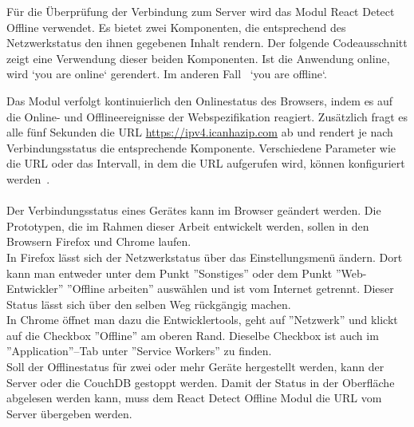 Für die Überprüfung der Verbindung zum Server wird das Modul React Detect Offline verwendet.
Es bietet zwei Komponenten, die entsprechend des Netzwerkstatus den ihnen gegebenen Inhalt rendern.
Der folgende Codeausschnitt zeigt eine Verwendung dieser beiden Komponenten. Ist die Anwendung online, wird `you are online` gerendert. Im anderen Fall ~`you are offline`.
%
\begin{center}

\end{center}
%
Das Modul verfolgt kontinuierlich den Onlinestatus des Browsers, indem es auf die Online- und Offlineereignisse der Webspezifikation reagiert. Zusätzlich fragt es alle fünf Sekunden die URL \url{https://ipv4.icanhazip.com} ab und rendert je nach Verbindungsstatus die entsprechende Komponente.
Verschiedene Parameter wie die URL oder das Intervall, in dem die URL aufgerufen wird, können konfiguriert werden~\cite{react-detect}. \\\\
%
Der Verbindungsstatus eines Gerätes kann im Browser geändert werden.
Die Prototypen, die im Rahmen dieser Arbeit entwickelt werden, sollen in den Browsern Firefox und Chrome laufen.\\
In Firefox lässt sich der Netzwerkstatus über das Einstellungsmenü ändern. Dort kann man entweder unter dem Punkt ''Sonstiges'' oder dem Punkt ''Web-Entwickler'' ''Offline arbeiten'' auswählen und ist vom Internet getrennt. Dieser Status lässt sich über den selben Weg rückgängig machen.\\
In Chrome öffnet man dazu die Entwicklertools, geht auf ''Netzwerk'' und klickt auf die Checkbox ''Offline'' am oberen Rand. Dieselbe Checkbox ist auch im ''Application''--Tab unter ''Service Workers'' zu finden.\\
Soll der Offlinestatus für zwei oder mehr Geräte hergestellt werden, kann der Server oder die CouchDB gestoppt werden. Damit der Status in der Oberfläche abgelesen werden kann, muss dem React Detect Offline Modul die URL vom Server übergeben werden.